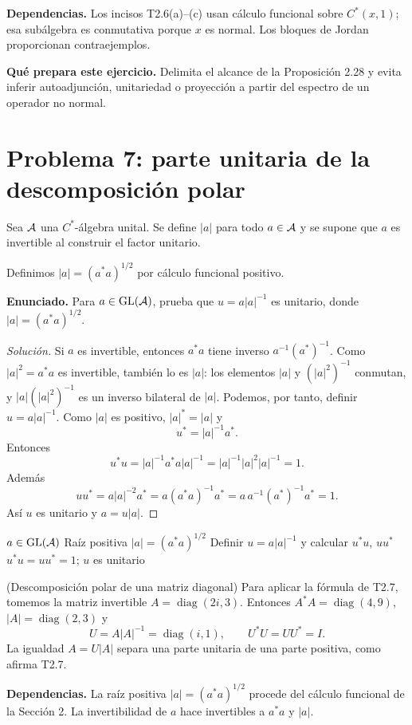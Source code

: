 \noindent\textbf{Dependencias.} Los incisos T2.6(a)--(c) usan cálculo funcional sobre $C^*(x,1)$; esa subálgebra es conmutativa porque $x$ es normal. Los bloques de Jordan proporcionan contraejemplos.

\noindent\textbf{Qué prepara este ejercicio.} Delimita el alcance de la Proposición 2.28 y evita inferir autoadjunción, unitariedad o proyección a partir del espectro de un operador no normal.

\pagebreak
\section{Problema 7: parte unitaria de la descomposición polar}

Sea $\mathcal A$ una $C^*$-álgebra unital. Se define $|a|$ para todo $a\in\mathcal A$ y se supone que $a$ es
invertible al construir el factor unitario.


Definimos $|a|=(a^*a)^{1/2}$ por cálculo funcional positivo.

\noindent\textbf{Enunciado.} Para $a\in\operatorname{GL}(\mathcal A)$, prueba que $u=a|a|^{-1}$ es unitario, donde $|a|=(a^*a)^{1/2}$.

\begin{proof}[Solución]
Si $a$ es invertible, entonces $a^*a$ tiene inverso $a^{-1}(a^*)^{-1}$.
Como $|a|^2=a^*a$ es invertible, también lo es $|a|$: los elementos $|a|$ y
$(|a|^2)^{-1}$ conmutan, y $|a|(|a|^2)^{-1}$ es un inverso bilateral de $|a|$.
Podemos, por tanto, definir $u=a|a|^{-1}$.
Como $|a|$ es positivo, $|a|^*=|a|$ y
\[
 u^*=|a|^{-1}a^*.
\]
Entonces
\[
 u^*u=|a|^{-1}a^*a|a|^{-1}
 =|a|^{-1}|a|^2|a|^{-1}=1.
\]
Además
\[
 uu^*=a|a|^{-2}a^*
 =a(a^*a)^{-1}a^*
 =a\,a^{-1}(a^*)^{-1}a^*=1.
\]
Así $u$ es unitario y $a=u|a|$.
\end{proof}

\proofdiagram
{$a\in\operatorname{GL}(\mathcal A)$}
{Raíz positiva $|a|=(a^*a)^{1/2}$}
{Definir $u=a|a|^{-1}$ y calcular $u^*u$, $uu^*$}
{$u^*u=uu^*=1$; $u$ es unitario}

\begin{cthejemplo}{(Descomposición polar de una matriz diagonal)}
Para aplicar la fórmula de T2.7, tomemos la matriz invertible
$A=\operatorname{diag}(2i,3)$.
Entonces $A^*A=\operatorname{diag}(4,9)$,
$|A|=\operatorname{diag}(2,3)$ y
\[
 U=A|A|^{-1}=\operatorname{diag}(i,1),\qquad U^*U=UU^*=I.
\]
La igualdad $A=U|A|$ separa una parte unitaria de una parte positiva, como afirma T2.7.
\end{cthejemplo}

\noindent\textbf{Dependencias.} La raíz positiva $|a|=(a^*a)^{1/2}$ procede del cálculo funcional de la Sección 2. La invertibilidad de $a$ hace invertibles a $a^*a$ y $|a|$.

